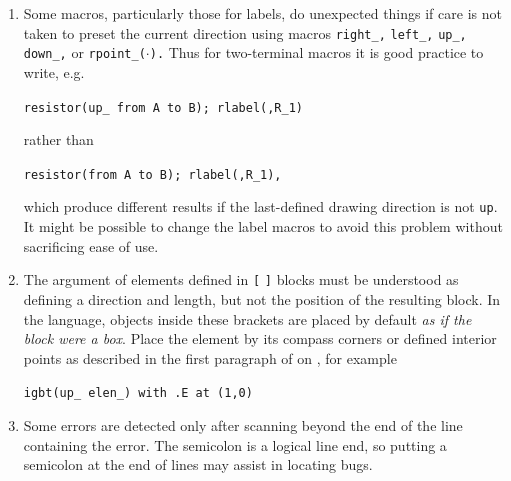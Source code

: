 \begin{enumerate}
{\tt arrow right `\verb|"$\dot x$"|'\ above}

Library macros intended only for internal use have names that begin
with {\tt m4} or {\tt M4} to avoid name clashes, but in addition,
a good rule is to quote all \latex in the diagram input.

If extensive use of strings
that conflict with macro names is required, then one possibility is
to replace the strings by macros to be expanded by \latex, for example
the diagram

{\tt
.PS\hfill\break
   \hspace*{\parindent} box \verb|"\stringA"|\hfill\break
.PE
}

\noindent with the \latex macro

{\tt
  \verb|\newcommand{\stringA}{|%

   \verb|Circuit containing planar inductor and capacitor}|
}

\item 
{}
 Some macros, particularly those for labels, do
unexpected things if care is not taken to preset the current direction
using macros {\tt right\_,} {\tt left\_,} {\tt up\_,} {\tt down\_,}
or {\tt rpoint\_($\cdot$).}
Thus for two-terminal macros it is good practice to write, e.g.

{\tt resistor(up\_ from A to B); rlabel(,R\_1)}

\noindent%
rather than 

{\tt resistor(from A to B); rlabel(,R\_1),}

\noindent%
which produce different results if the last-defined drawing direction is not
{\tt up}.  It might be possible to change the label macros to avoid this problem
without sacrificing ease of use.

\item
{}
  The \linespec argument of elements defined in {\tt[} {\tt]}
  blocks must be understood as defining a direction and length, but
  not the position of the resulting block.
  In the \pic language, objects inside these brackets are placed by
  default {\em as if the block were a box}.  Place the
  element by its compass corners or defined interior points
  as described in the first paragraph of  on
  , for example  
  
{\tt igbt(up\_ elen\_) with .E at (1,0)}

\item
{}
 Some errors are detected only after scanning
  beyond the end of the line containing the error.  The semicolon
  is a logical line end, so putting a semicolon at the end of lines may
  assist in locating bugs. 


\end{enumerate}
